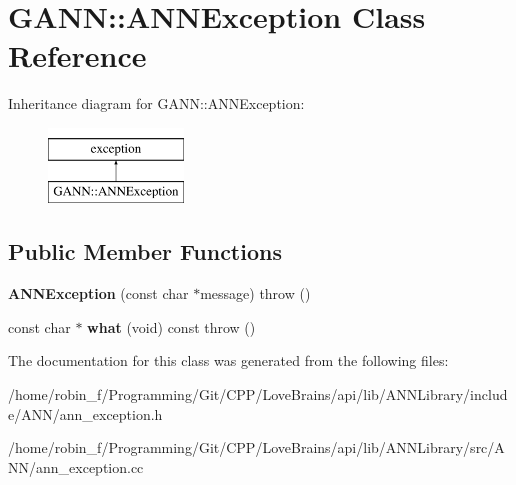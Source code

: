 \hypertarget{class_g_a_n_n_1_1_a_n_n_exception}{}\section{G\+A\+N\+N\+:\+:A\+N\+N\+Exception Class Reference}
\label{class_g_a_n_n_1_1_a_n_n_exception}
Inheritance diagram for G\+A\+N\+N\+:\+:A\+N\+N\+Exception\+:\begin{figure}[H]
\begin{center}
\leavevmode
\includegraphics[height=2.000000cm]{class_g_a_n_n_1_1_a_n_n_exception}
\end{center}
\end{figure}
\subsection*{Public Member Functions}
\begin{DoxyCompactItemize}
\item 
\hypertarget{class_g_a_n_n_1_1_a_n_n_exception_ab5cf645781b58f0b3d58c3839012dd4a}{}{\bfseries A\+N\+N\+Exception} (const char $\ast$message)  throw ()\label{class_g_a_n_n_1_1_a_n_n_exception_ab5cf645781b58f0b3d58c3839012dd4a}

\item 
\hypertarget{class_g_a_n_n_1_1_a_n_n_exception_ac2f2ed402eaf48a7703f845155382d92}{}const char $\ast$ {\bfseries what} (void) const   throw ()\label{class_g_a_n_n_1_1_a_n_n_exception_ac2f2ed402eaf48a7703f845155382d92}

\end{DoxyCompactItemize}


The documentation for this class was generated from the following files\+:\begin{DoxyCompactItemize}
\item 
/home/robin\+\_\+f/\+Programming/\+Git/\+C\+P\+P/\+Love\+Brains/api/lib/\+A\+N\+N\+Library/include/\+A\+N\+N/ann\+\_\+exception.\+h\item 
/home/robin\+\_\+f/\+Programming/\+Git/\+C\+P\+P/\+Love\+Brains/api/lib/\+A\+N\+N\+Library/src/\+A\+N\+N/ann\+\_\+exception.\+cc\end{DoxyCompactItemize}
